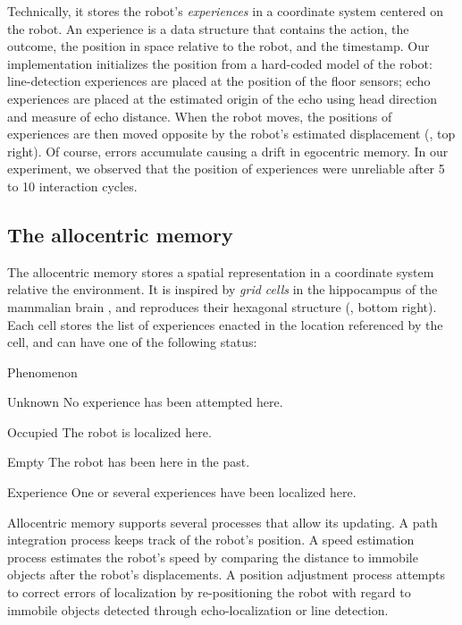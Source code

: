 \documentclass[pmlr]{jmlr}%
\begin{document}
Technically, it stores the robot's \textit{experiences} in a coordinate system centered on the robot.
An experience is a data structure that contains the action, the outcome, the position in space relative to the robot, and the timestamp. 
Our implementation initializes the position from a hard-coded model of the robot: line-detection experiences are placed at the position of the floor sensors; echo experiences are placed at the estimated origin of the echo using head direction and measure of echo distance.  
When the robot moves, the positions of experiences are then moved opposite by the robot's estimated displacement (, top right). 
Of course, errors accumulate causing a drift in egocentric memory. 
In our experiment, we observed that the position of experiences were unreliable after 5 to 10 interaction cycles.


\subsection{The allocentric memory}

The allocentric memory stores a spatial representation in a coordinate system relative the environment. 
It is inspired by \textit{grid cells} in the hippocampus of the mammalian brain \citep{grieves_representation_2017}, and reproduces their hexagonal structure (, bottom right). 
Each cell stores the list of experiences enacted in the location referenced by the cell, and can have one of the following status:

\begin{altdescription}{Phenomenon}
	\item[Unknown] No experience has been attempted here.
	\item[Occupied] The robot is localized here.
	\item[Empty] The robot has been here in the past.
	\item[Experience] One or several experiences have been localized here.
\end{altdescription}

Allocentric memory supports several processes that allow its updating.
A path integration process keeps track of the robot's position.
A speed estimation process estimates the robot's speed by comparing the distance to immobile objects after the robot's displacements.
A position adjustment process attempts to correct errors of localization by re-positioning the robot with regard to immobile objects detected through echo-localization or line detection.    
\end{document}
